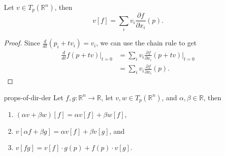 \documentclass[10pt]{report}
\begin{document}
\begin{prop}
	\label{prop:dir-der}
	Let $v \in T_p(\mathbb{R}^n)$, then
	\[
		v[f] = \sum_i v_i \frac{\partial f}{\partial x_i} (p).
	\] 
\end{prop}
\begin{proof}
	Since $\frac{d }{d t} (p_i + tv_i) = v_i$, we can use the chain rule to get
	\begin{align*}
		\frac{d }{d t} f(p+tv) \Big|_{t=0} &= \sum_{i} v_i \frac{\partial f}{\partial x_i} (p+tv) \Big|_{t=0} \\
						   &= \sum_i v_i \frac{\partial f}{\partial x_i} (p).
	\end{align*}
\end{proof}

\begin{thrm}{}{props-of-dir-der}
	Let $f,g:\mathbb{R}^n \to \mathbb{R}$, let $v,w \in T_p(\mathbb{R}^n)$, and $\alpha,\beta\in\mathbb{R}$, then
	\begin{enumerate}
		\item $(\alpha v + \beta w)[f] = \alpha v[f] + \beta w[f]$,
		\item $v[\alpha f + \beta g] = \alpha v[f] + \beta v[g]$, and
		\item $v[fg] = v[f] \cdot g(p) + f(p) \cdot v[g]$.
	\end{enumerate}
\end{thrm}
\end{document}
